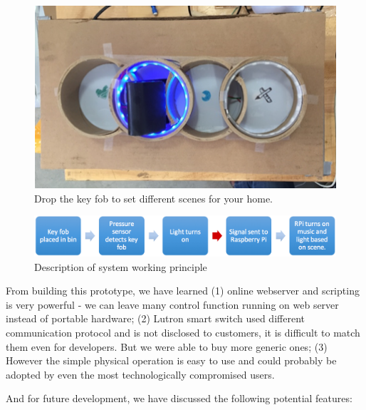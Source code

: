 \begin{figure}
\centering
\includegraphics[width=5in]{Figures/Prototypes/Funky/FunkyPrototype.png}
	\caption{Drop the key fob to set different scenes for your home.}
		\label{fig:FunkyPrototype}
\end{figure}

\begin{figure}
\centering
\includegraphics[width=5in]{Figures/Prototypes/Funky/FunkyPrototypePrinciple.png}
	\caption{Description of system working principle}
		\label{fig:FunkyPrototypePrinciple}
\end{figure}

From building this prototype, we have learned (1) online webserver and scripting is very powerful - we can leave many control function running on web server instead of portable hardware; (2) Lutron smart switch used different communication protocol and is not disclosed to customers, it is difficult to match them even for developers. But we were able to buy more generic ones; (3) However the simple physical operation is easy to use and could probably be adopted by even the most technologically compromised users.

And for future development, we have discussed the following potential features:


